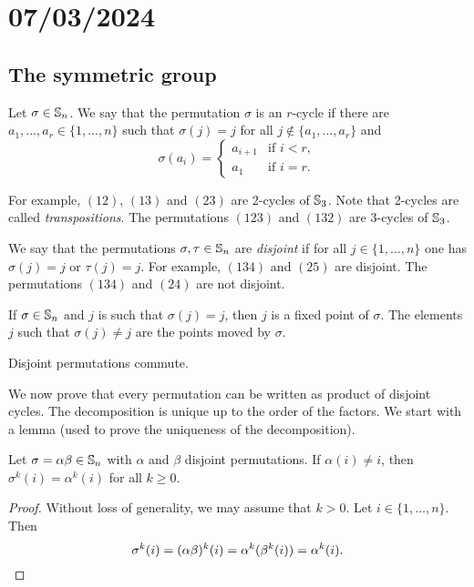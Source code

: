 \section{07/03/2024}

\subsection{The symmetric group}

Let $\sigma\in\mathbb{S}_n$. We say that the permutation $\sigma$ is an $r$-cycle 
if there are $a_1,\dots,a_r\in\{1,\dots,n\}$ such that 
$\sigma(j)=j$ for all $j\not\in\{a_1,\dots,a_r\}$ and 
\[
\sigma(a_i)=\begin{cases}
a_{i+1} & \text{if $i<r$},\\
a_1 & \text{if $i=r$}.
\end{cases}
\]

For example, $(12)$, $(13)$ and $(23)$ are 2-cycles of 
$\mathbb{S}_3$. Note that 
2-cycles are called \emph{transpositions}.
The permutations $(123)$ and $(132)$ are 3-cycles of $\mathbb{S}_3$.

We say that the permutations $\sigma,\tau\in\mathbb{S}_n$ 
are \emph{disjoint} if for all 
$j\in\{1,\dots,n\}$
one has $\sigma(j)=j$ or $\tau(j)=j$. For example, 
$(134)$ and $(25)$ are disjoint. The permutations $(134)$ and 
$(24)$ are not disjoint. 

If $\sigma\in\mathbb{S}_n$ and $j$ is such that 
$\sigma(j)=j$, then $j$ is a fixed point of $\sigma$. The elements 
$j$ such that 
$\sigma(j)\ne j$ are the points moved by 
$\sigma$.

\begin{claim}
Disjoint permutations commute. 
\end{claim}


We now prove that every permutation can be written 
as product of disjoint cycles. 
The decomposition is unique up to the order of the factors. 
We start with a lemma (used to prove the uniqueness of the decomposition).

\begin{lemma}
        Let $\sigma=\alpha\beta\in\mathbb{S}_n$ with $\alpha$ and $\beta$ disjoint permutations. If $\alpha(
i)\ne i$, then $\sigma^k(i)=\alpha^k(i)$ for all $k\geq0$.
\end{lemma}

\begin{proof}
    Without loss of generality, we may assume that $k>0$. 
    Let $i\in\{1,\dots,n\}$. Then \[
    \sigma^k(i)=(\alpha\beta)^k(i)=\alpha^k(\beta^k(i))=\alpha^k(i).\qedhere
    \]
\end{proof}

